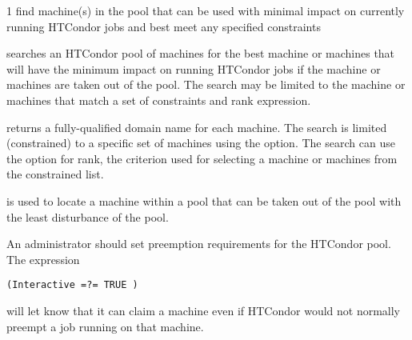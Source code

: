 \begin{ManPage}{\label{man-condor-findhost}}{1}
{find machine(s) in the pool that 
can be used with minimal impact on currently running HTCondor jobs
and best meet any specified constraints}

\Synopsis {}

\Description

 searches an HTCondor pool of machines for the
best machine or machines that
will have the minimum impact on running HTCondor jobs
if the machine or machines are taken out of the pool.
The search may be limited to the machine or machines 
that match a set of constraints and rank expression.

returns a fully-qualified domain name for each machine.
The search is limited (constrained) to a specific set of machines
using the  option.
The search can use the  option for rank,
the criterion used for selecting a machine or machines from the
constrained list.

\begin{Options}
\end{Options}

\GenRem

 is used to locate a machine
within a pool that can be taken out of the pool with the least
disturbance of the pool.

An administrator should set preemption requirements for
the HTCondor pool.
The expression 
\begin{verbatim}
(Interactive =?= TRUE )
\end{verbatim}
will let  know that it can claim a machine even
if HTCondor would not normally preempt a job running on that machine.


\end{ManPage}
